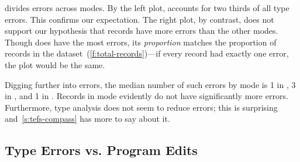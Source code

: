 \documentclass[english,submission,cleveref]{programming}
\begin{document}
 divides errors across modes.
By the left plot, \mnonstrict{} accounts for two thirds of all type errors.
This confirms our expectation.
The right plot, by contrast, does not support our hypothesis that \mnocheck{}
records have more \FS{} errors than the other modes.
Though \mnocheck{} does have the most \FS{} errors, its \emph{proportion} matches
the proportion of \mnocheck{} records in the
dataset~(\cref{f:total-records})---if every record had exactly one \FS{} error,
the plot would be the same.

Digging further into \FS{} errors, the median number of such errors by mode is
1 in \mnocheck{}, 3 in \mnonstrict{}, and 1 in \mstrict{}.
Records in \mnocheck{} mode evidently do not have significantly more \FS{}
errors.
Furthermore, type analysis does not seem to reduce \FS{}
errors; this is surprising and~\cref{s:tefs-compass} has more to say about it.


\subsection{Type Errors vs. Program Edits}
\label{s:type-error-survival}
\end{document}
